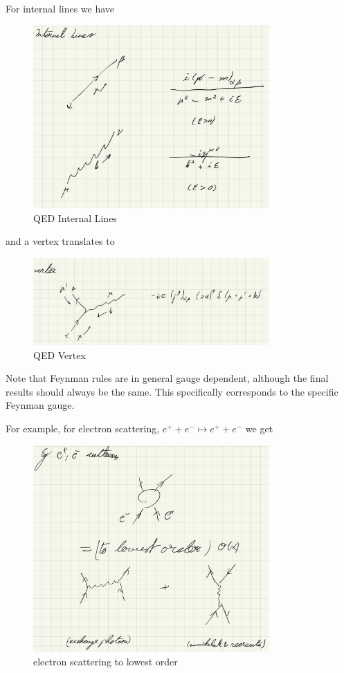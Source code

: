 \documentclass{article}
\theoremstyle{definition}
\begin{document}
For internal lines we have

\begin{figure}[H]
  \centering
  \includegraphics[width=9cm]{res/QFT/qed_internal_lines}
  \caption{QED Internal Lines}
  \label{qed_internal_lines}
\end{figure}

and a vertex translates to

\begin{figure}[H]
  \centering
  \includegraphics[width=9cm]{res/QFT/qed_vertex}
  \caption{QED Vertex}
  \label{qed_vertex}
\end{figure}

Note that Feynman rules are in general gauge dependent, although the final
results should always be the same. This specifically corresponds to the specific
Feynman gauge.

For example, for electron scattering, $e^+ + e^- \mapsto e^+ + e^-$ we get

\begin{figure}[H]
  \centering
  \includegraphics[width=9cm]{res/QFT/qed_electron_scattering}
  \caption{electron scattering to lowest order}
  \label{qed_electron_scattering}
\end{figure}
\end{document}
